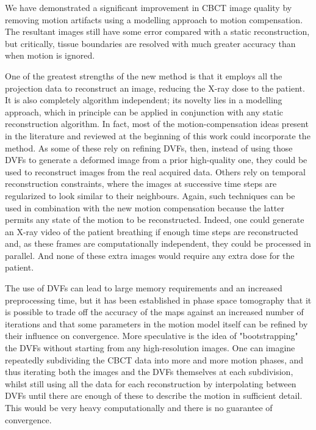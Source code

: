 We have demonstrated a significant improvement in CBCT image quality by removing motion artifacts using a modelling approach to motion compensation.  The resultant images still have some error compared with a static reconstruction, but critically, tissue boundaries are resolved with much greater accuracy than when motion is ignored. 

One of the greatest strengths of the new method is that it employs all the projection data to reconstruct an image, reducing the X-ray dose to the patient.  It is also completely algorithm independent; its novelty lies in a modelling approach, which in principle can be applied in conjunction with any static reconstruction algorithm.  In fact, most of the motion-compensation ideas present in the literature and reviewed at the beginning of this work could incorporate the method.  As some of these rely on refining DVFs, then, instead of using those DVFs to generate a deformed image from a prior high-quality one, they could be used to reconstruct images from the real acquired data.  Others rely on temporal reconstruction constraints, where the images at successive time steps are regularized to look similar to their neighbours.  Again, such techniques can be used in combination with the new motion compensation because the latter permits any state of the motion to be reconstructed.  Indeed, one could generate an X-ray video of the patient breathing if enough time steps are reconstructed and, as these frames are computationally independent, they could be processed in parallel.  And none of these extra images would require any extra dose for the patient.

The use of DVFs can lead to large memory requirements and an increased preprocessing time, but it has been established in phase space tomography that it is possible to trade off the accuracy of the maps against an increased number of iterations and that some parameters in the motion model itself can be refined by their influence on convergence\cite{pst1}\cite{pst2}.  More speculative is the idea of "bootstrapping" the DVFs without starting from any high-resolution images.  One can imagine repeatedly subdividing the CBCT data into more and more motion phases, and thus iterating both the images and the DVFs themselves at each subdivision, whilst still using all the data for each reconstruction by interpolating between DVFs until there are enough of these to describe the motion in sufficient detail.  This would be very heavy computationally and there is no guarantee of convergence.

